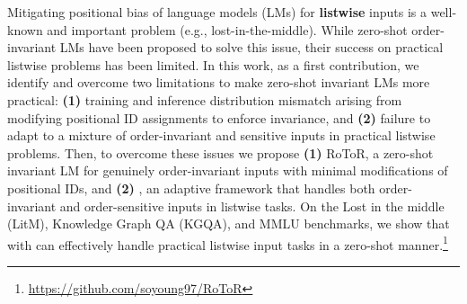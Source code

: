Mitigating positional bias of language models (LMs) for \textbf{listwise} inputs is a well-known and important problem (e.g., lost-in-the-middle). While zero-shot order-invariant LMs have been proposed to solve this issue, their success on practical listwise problems has been limited. In this work, as a first contribution, we identify
and overcome two limitations to make zero-shot invariant LMs more practical: \textbf{(1)} training and inference distribution mismatch arising from modifying positional ID assignments to enforce invariance, and \textbf{(2)} failure to adapt to
a mixture of order-invariant
and sensitive inputs in
practical listwise problems. Then, to overcome these issues we propose \textbf{(1)} RoToR, a zero-shot invariant LM for genuinely order-invariant inputs with minimal modifications of positional IDs, and \textbf{(2)} \sr{}, an adaptive framework that handles both order-invariant and order-sensitive inputs in listwise tasks. On the Lost in the middle (LitM), Knowledge Graph QA (KGQA), and MMLU benchmarks, we show that \ours{} with \sr{} can effectively handle practical listwise input tasks in a zero-shot manner.\footnote{\url{https://github.com/soyoung97/RoToR}}